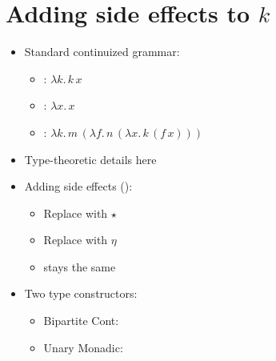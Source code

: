 \section{Adding side effects to $k$}
\begin{itemize}
	\item Standard continuized grammar:
	\begin{itemize}
		\item {}: $\lambda k.\,k\,x$
		\item {}: $\lambda x.\,x$
		\item {}: $\lambda k.\,m\,(\lambda f.\,n\,(\lambda x.\,k\,(f\,x)))$%
	\end{itemize}

	\item Type-theoretic details here
	
	\item Adding side effects (\citealt{Wadler:1994, Wadler:1995, Shan:2002}): 
	\begin{itemize}
		\item Replace  with $\star$
		\item Replace  with $\eta$
		\item {} stays the same
	\end{itemize}

	\item Two type constructors:
	\begin{itemize}
		\item Bipartite Cont: 
		\item Unary Monadic: 
	\end{itemize}
	
\end{itemize}

